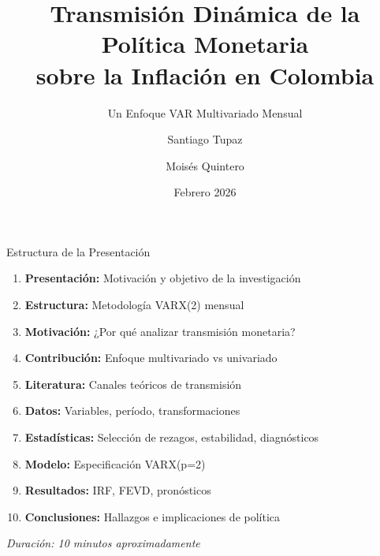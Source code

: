 \documentclass[spanish, 11pt]{beamer}
\title{\Large \textbf{Transmisión Dinámica de la Política Monetaria \\ sobre la Inflación en Colombia}}
\subtitle{Un Enfoque VAR Multivariado Mensual}
\author{Santiago Tupaz \and Moisés Quintero}
\institute{Universidad EAFIT \\ Econometría II}
\date{Febrero 2026}
\begin{document}
\begin{frame}[plain]
\maketitle
\end{frame}

\begin{frame}{Estructura de la Presentación}
\begin{enumerate}
  \item \textbf{Presentación:} Motivación y objetivo de la investigación
  \item \textbf{Estructura:} Metodología VARX(2) mensual
  \item \textbf{Motivación:} ¿Por qué analizar transmisión monetaria?
  \item \textbf{Contribución:} Enfoque multivariado vs univariado
  \item \textbf{Literatura:} Canales teóricos de transmisión
  \item \textbf{Datos:} Variables, período, transformaciones
  \item \textbf{Estadísticas:} Selección de rezagos, estabilidad, diagnósticos
  \item \textbf{Modelo:} Especificación VARX(p=2)
  \item \textbf{Resultados:} IRF, FEVD, pronósticos
  \item \textbf{Conclusiones:} Hallazgos e implicaciones de política
\end{enumerate}
\centering
\vspace{0.5cm}
{\small \textit{Duración: 10 minutos aproximadamente}}
\end{frame}
\end{document}
